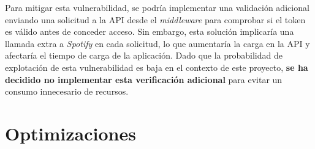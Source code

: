 Para mitigar esta vulnerabilidad, se podría implementar una validación adicional enviando una solicitud a la API desde el \textit{middleware} para comprobar si el token es válido antes de conceder acceso. Sin embargo, esta solución implicaría una llamada extra a \textit{Spotify} en cada solicitud, lo que aumentaría la carga en la API y afectaría el tiempo de carga de la aplicación. Dado que la probabilidad de explotación de esta vulnerabilidad es baja en el contexto de este proyecto, \textbf{se ha decidido no implementar esta verificación adicional} para evitar un consumo innecesario de recursos.


\section{Optimizaciones}